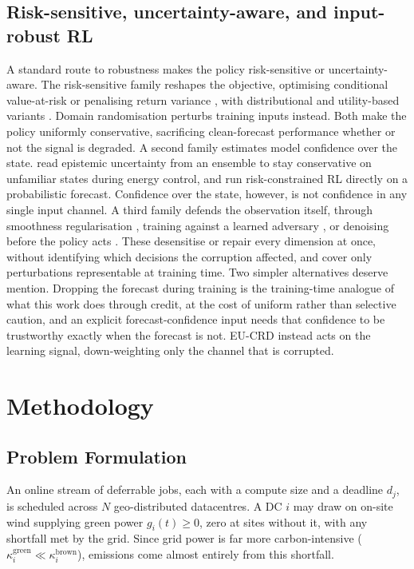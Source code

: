 \documentclass{article} %
\begin{document}
\subsection{Risk-sensitive, uncertainty-aware, and input-robust RL}
A standard route to robustness makes the policy risk-sensitive or uncertainty-aware. The risk-sensitive family reshapes the objective, optimising conditional value-at-risk \citep{2888116.2888133} or penalising return variance \citep{di2012policy}, with distributional and utility-based variants \citep{pmlr-v80-dabney18a}. Domain randomisation \citep{tobinDomainRandomizationTransferring2017} perturbs training inputs instead. Both make the policy uniformly conservative, sacrificing clean-forecast performance whether or not the signal is degraded. A second family estimates model confidence over the state. \citet{anCLUESafeModelBased2023} read epistemic uncertainty from an ensemble to stay conservative on unfamiliar states during energy control, and \citet{korenUAMDPUncertaintyAwareMarkov2025} run risk-constrained RL directly on a probabilistic forecast. Confidence over the state, however, is not confidence in any single input channel. A third family defends the observation itself, through smoothness regularisation \citep{zhang2020robust}, training against a learned adversary \citep{zhang2021robust}, or denoising before the policy acts \citep{yang2024dmbp}. These desensitise or repair every dimension at once, without identifying which decisions the corruption affected, and cover only perturbations representable at training time. Two simpler alternatives deserve mention. Dropping the forecast during training is the training-time analogue of what this work does through credit, at the cost of uniform rather than selective caution, and an explicit forecast-confidence input needs that confidence to be trustworthy exactly when the forecast is not. EU-CRD instead acts on the learning signal, down-weighting only the channel that is corrupted.

\section{Methodology}
\label{sec:method}
\subsection{Problem Formulation}
\label{sec:problem}

An online stream of deferrable jobs, each with a compute size and a deadline $d_j$, is scheduled across $N$ geo-distributed datacentres. A DC $i$ may draw on on-site wind supplying green power $g_i(t)\ge 0$, zero at sites without it, with any shortfall met by the grid. Since grid power is far more carbon-intensive ($\kappa^{\text{green}}_i \ll \kappa^{\text{brown}}_i$), emissions come almost entirely from this shortfall.
\end{document}
